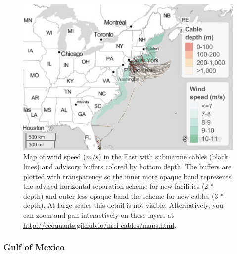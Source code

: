 \documentclass[]{article}
\begin{document}
\begin{figure}
\centering
\includegraphics{report_files/figure-latex/mapWindEast-1.pdf}
\caption{\label{fig:mapWindEast}Map of wind speed (\(m/s\)) in the East with
submarine cables (black lines) and advisory buffers colored by bottom
depth. The buffers are plotted with transparency so the inner more
opaque band represents the advised horizontal separation scheme for new
facilities (2 * depth) and outer less opaque band the scheme for new
cables (3 * depth). At large scales this detail is not visible.
Alternatively, you can zoom and pan interactively on these layers at
\url{http://ecoquants.github.io/nrel-cables/maps.html}.}
\end{figure}

\hypertarget{gulf-of-mexico-2}{%
\subsubsection{Gulf of Mexico}\label{gulf-of-mexico-2}}
\end{document}
